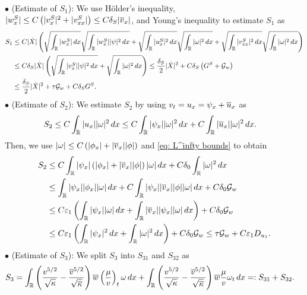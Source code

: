 \documentclass[11pt,reqno]{amsart}
\begin{document}
\begin{appendix}
\noindent $\bullet$ (Estimate of $S_1$): We use H\"older's inequality, $|w^S_x| \le C \left( |v^S_x|^2 +|v^S_{xx}| \right) \le C \delta_S |\overline{v}_x| $, and Young's inequality to estimate $S_1$ as
\begin{align*}
S_1 &\le C  |\dot{X}| \left( \sqrt{ \int_\mathbb{R} |w^S_x| \, dx}\sqrt{\int_\mathbb{R} |w^S_x| |\psi|^2 \, dx }+\sqrt{ \int_\mathbb{R} |u^S_x|^2 \, dx}\sqrt{\int_\mathbb{R} |\omega|^2 \, dx}+\sqrt{ \int_\mathbb{R} |v^S_{xx}|^2 \, dx}\sqrt{\int_\mathbb{R} |\omega|^2 \, dx} \right) \\
&\le C \delta_S |\dot{X}| \left(\sqrt{\int_\mathbb{R} |v^S_x| |\psi|^2 \, dx }+\sqrt{\int_\mathbb{R} |\omega|^2 \, dx}\right) \le \frac{\delta_S}{2} |\dot{X}|^2 + C \delta_S \left( G^S+\mathcal{G}_w \right) \\ 
&\le \frac{\delta_S}{2}|\dot{X}|^2 +\tau \mathcal{G}_w + C \delta_S G^S.
\end{align*}
\noindent$\bullet$ (Estimate of $S_2$):
We estimate $S_2$ by using $v_t=u_x=\psi_x + \overline{u}_x$ as
\begin{align*}
S_2 &\le C \int_\mathbb{R} |u_x| |\omega|^2 \, dx \le C \int_\mathbb{R} |\psi_x| |\omega|^2 \, dx + C \int_\mathbb{R} |\overline{u}_x| |\omega|^2 \, dx .
\end{align*}
Then, we use $|\omega| \le C  \left( | \phi_x| + |\overline{v}_x| |\phi | \right) $ and \eqref{eq: L^infty bounds} to obtain
\begin{align*}
S_2 &\le C  \int_\mathbb{R} |\psi_x| \left( | \phi_x| + |\overline{v}_x| |\phi| \right)  |\omega| \, dx + C \delta_0 \int_\mathbb{R} |\omega|^2 \, dx\\
&\le \int_\mathbb{R} |\psi_x| |\phi_x| |\omega| \, dx + C \int_\mathbb{R} |\psi_x| |\overline{v}_x| |\phi| |\omega| \, dx + C \delta_0 \mathcal{G}_w\\
&\le C \varepsilon_1 \left( \int_\mathbb{R} |\psi_x| |\omega| \, dx + \int_\mathbb{R} |\overline{v}_x| |\psi_x| |\omega| \, dx \right) + C \delta_0 \mathcal{G}_w\\
&\le C \varepsilon_1 \left( \int_\mathbb{R} |\psi_x|^2 \, dx + \int_\mathbb{R}  |\omega|^2 \, dx   \right) + C \delta_0 \mathcal{G}_w  \le \tau \mathcal{G}_w +  C \varepsilon_1 D_{u_1}.
\end{align*}
\noindent $\bullet$ (Estimate of $S_3$): We split $S_{3}$ into $S_{31}$ and $S_{32}$ as 
\begin{align*}
S_{3} &=   \int_\mathbb{R} \left(\frac{v^{5/2}}{\sqrt{\kappa}}-\frac{\ov^{5/2}}{\sqrt{\ok}}\right) \ow \left( \frac{\mu}{v} \right)_t \omega  \,dx +\int_\mathbb{R} \left(\frac{v^{5/2}}{\sqrt{\kappa}}-\frac{\ov^{5/2}}{\sqrt{\ok}}\right) \ow  \frac{\mu}{v}  \omega_t \,dx=: S_{31} + S_{32}.

\end{align*}
\end{appendix}
\end{document}
